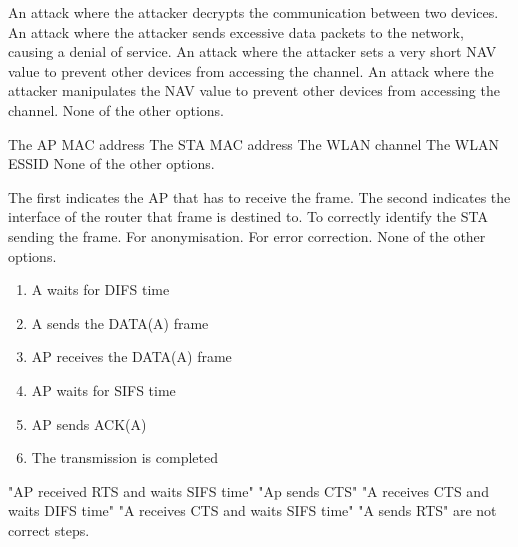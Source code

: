 \begin{checkboxes}
    \choice An attack where the attacker decrypts the communication between two devices.
    \choice An attack where the attacker sends excessive data packets to the network, causing a denial of service.
    \choice An attack where the attacker sets a very short NAV value to prevent other devices from accessing the channel.
    \CorrectChoice An attack where the attacker manipulates the NAV value to prevent other devices from accessing the channel.
    \choice None of the other options.
\end{checkboxes}


\begin{checkboxes}
    \CorrectChoice The AP MAC address
    \CorrectChoice The STA MAC address
    \CorrectChoice The WLAN channel
    \choice The WLAN ESSID
    \choice None of the other options.
\end{checkboxes}


\begin{checkboxes}
    \CorrectChoice The first indicates the AP that has to receive the frame. The second indicates the interface of the router that frame is destined to.
    \choice To correctly identify the STA sending the frame.
    \choice For anonymisation.
    \choice For error correction.
    \choice None of the other options.
\end{checkboxes}

\begin{solution}
    \begin{enumerate}
        \item A waits for DIFS time
        \item A sends the DATA(A) frame
        \item AP receives the DATA(A) frame
        \item AP waits for SIFS time
        \item AP sends ACK(A)
        \item The transmission is completed
    \end{enumerate}
    "AP received RTS and waits SIFS time"
    "Ap sends CTS"
    "A receives CTS and waits DIFS time"
    "A receives CTS and waits SIFS time"
    "A sends RTS"
    are not correct steps.
\end{solution}

